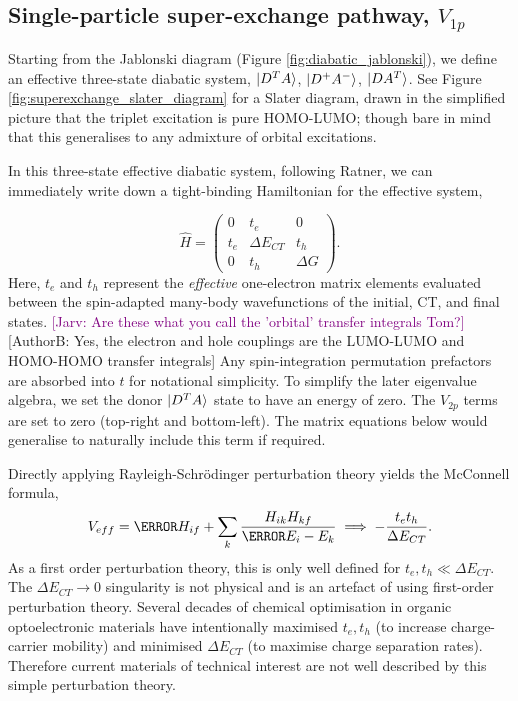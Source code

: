 \documentclass[aps,physrev,reprint,superscriptaddress,nofootinbib,amsmath,amssymb,a4paper]{revtex4-2}
\DeclarePairedDelimiter\ket{\lvert}{\rangle}
\newcommand{\jarv}[1]{\textcolor{purple}{[Jarv: #1]}}
\newcommand{\tom}[1]{\textcolor{orange!80!black}{[AuthorB: #1]}}
\begin{document}
\subsection{Single-particle super-exchange pathway, $V_{1p}$}

Starting from the Jablonski diagram (Figure \ref{fig:diabatic_jablonski}), we define an effective three-state diabatic system, $\ket{D^T A}$, $\ket{D^+ A^-}$, $\ket{D A^T}$. 
See Figure \ref{fig:superexchange_slater_diagram} for a Slater diagram, drawn in the simplified picture that the triplet excitation is pure HOMO-LUMO; though bare in mind that this generalises to any admixture of orbital excitations. 

In this three-state effective diabatic system, following Ratner\cite{Ratner1990}, we can immediately write down a tight-binding Hamiltonian for the effective system, 

\begin{equation}
\hat H = 
\begin{pmatrix} 
        0 & t_e & 0 \\ 
        t_e & \Delta E_{CT} & t_h \\ 
        0 & t_h & \Delta G 
    \end{pmatrix}
    .
    \label{H_tb}
\end{equation}
%
Here, $t_e$ and $t_h$ represent the \emph{effective} one-electron matrix elements evaluated between the spin-adapted many-body wavefunctions of the initial, CT, and final states.
\jarv{Are these what you call the 'orbital' transfer integrals Tom?}\tom{Yes, the electron and hole couplings are the LUMO-LUMO and HOMO-HOMO transfer integrals}
Any spin-integration permutation prefactors\cite{Krueger1998} are absorbed into $t$ for notational simplicity. 
To simplify the later eigenvalue algebra, we set the donor $\ket{D^T A}$ state to have an energy of zero. 
The $V_{2p}$ terms are set to zero (top-right and bottom-left). 
The matrix equations below would generalise to naturally include this term if required. 

Directly applying Rayleigh-Schr\"odinger perturbation theory yields the McConnell formula, 
\begin{equation}
    V_{eff} = \cancel{H_{if}} + \sum_k \frac{H_{ik} H_{kf}}{\cancel{E_i} - E_k} \implies -\frac{t_e t_h}{\Delta E_{CT}} .
\end{equation}
%
As a first order perturbation theory, this is only well defined for $t_e, t_h \ll \Delta E_{CT}$. 
The $\Delta E_{CT} \to 0$ singularity is not physical and is an artefact of using first-order perturbation theory. 
Several decades of chemical optimisation in organic optoelectronic materials have intentionally maximised $t_e, t_h$ (to increase charge-carrier mobility) and minimised $\Delta E_{CT}$ (to maximise charge separation rates). 
Therefore current materials of technical interest are not well described by this simple perturbation theory. 
\end{document}
